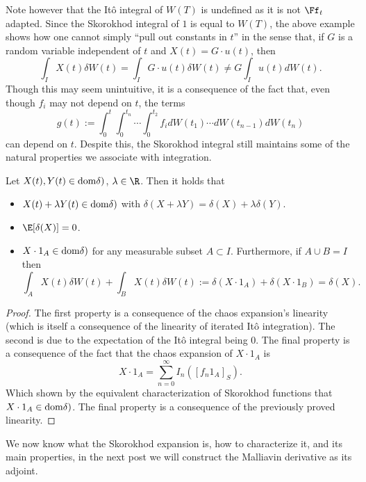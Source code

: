 \documentclass[
    a4paper,
    DIV=14,
    abstract=true,
    numbers=noenddot
]{scrartcl}
\begin{document}
Note however that the Itô integral of $W(T)$ is undefined as it is not  $\Ff_t$ adapted. Since the Skorokhod integral of $1$ is equal to  $W(T)$, the above example shows how one cannot simply ``pull out constants in $t$'' in the sense that, if $G$ is a random variable independent of  $t$ and  $X(t)=G\cdot u(t)$, then
\begin{equation*}
	\int_{I} X(t) \delta W(t)=\int_{I}G\cdot u(t)\delta W(t) \neq G\int_{I}u(t) dW(t).
\end{equation*}
Though this may seem unintuitive, it is a consequence of the fact that, even though $f_i$ may not depend on  $t$, the terms
\begin{equation*}
	g(t):=\int_{0}^t\int_{0}^{t_{n}}\cdots \int_{0}^{t_2} f_i dW(t_1)\cdots dW(t_{n-1})dW(t_n)
\end{equation*}
can depend on $t$. Despite this, the Skorokhod integral still maintains some of the natural properties we associate with integration.
\begin{proposition}
	Let $X(t), Y(t)\in \rm{dom}
\delta)$, $\lambda \in \R$. Then it holds that
	\begin{itemize}
		\item $X(t)+ \lambda Y(t) \in \rm{dom}
\delta)$ with $\delta(X+\lambda Y)=\delta(X)+\lambda \delta(Y)$.
		\item $\E[\delta(X)]=0$.
		\item $X\cdot 1_A \in \rm{dom}
\delta)$ for any measurable subset $A \subset I$. Furthermore, if $A \cup B =I$ then
		      \begin{equation*}
			      \int_{A}X(t) \delta W(t)+ \int_{B}X(t)\delta W(t):=\delta(X\cdot 1_A)+\delta(X\cdot 1_B)=\delta(X).
		      \end{equation*}

	\end{itemize}
\end{proposition}

\begin{proof}
	The first property is a consequence of the chaos expansion's linearity (which is itself  a consequence of the linearity of iterated Itô integration). The second is due to the expectation of the Itô integral being $0$. The final property is a consequence of the fact that the chaos expansion of $X\cdot 1_A$ is
	\begin{equation*}
		X\cdot 1_A=\sum_{n=0}^{\infty} I_{n}([f_n 1_A]_S).
	\end{equation*}
	Which shown by the equivalent characterization of Skorokhod functions that $X\cdot 1_A\in \rm{dom}
\delta)$. The final property is a consequence of the previously proved linearity.
\end{proof}
We now know what the Skorokhod expansion is, how to characterize it, and its main properties, in the next post we will construct the Malliavin derivative as its adjoint.
\end{document}
